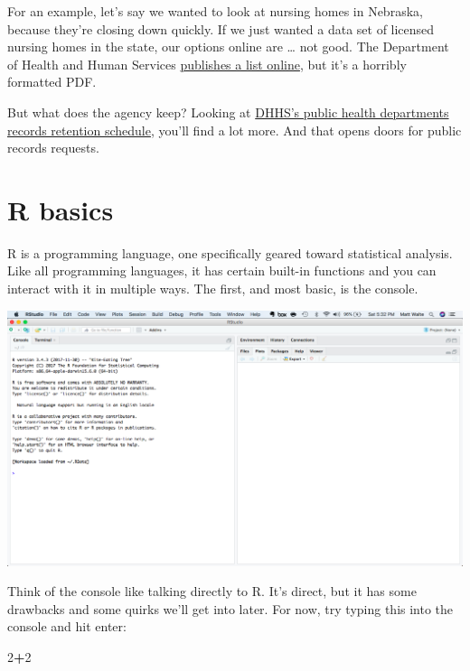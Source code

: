 \documentclass[]{book}
\newenvironment{Shaded}{\begin{snugshade}}{\end{snugshade}}
\newcommand{\DecValTok}[1]{\textcolor[rgb]{0.00,0.00,0.81}{#1}}
\newcommand{\OperatorTok}[1]{\textcolor[rgb]{0.81,0.36,0.00}{\textbf{#1}}}
\begin{document}
For an example, let's say we wanted to look at nursing homes in Nebraska, because they're closing down quickly. If we just wanted a data set of licensed nursing homes in the state, our options online are \ldots{} not good. The Department of Health and Human Services \href{http://dhhs.ne.gov/licensure/Documents/LTCRoster.pdf}{publishes a list online}, but it's a horribly formatted PDF.

But what does the agency keep? Looking at \href{https://sos.nebraska.gov/sites/sos.nebraska.gov/files/doc/records-management/state-government/Health-and-Human-Services/150-6-dhhs-licensure-unit-website-5-12-2014.pdf}{DHHS's public health departments records retention schedule}, you'll find a lot more. And that opens doors for public records requests.

\hypertarget{r-basics}{%
\chapter{R basics}\label{r-basics}}

R is a programming language, one specifically geared toward statistical analysis. Like all programming languages, it has certain built-in functions and you can interact with it in multiple ways. The first, and most basic, is the console.

\includegraphics[width=18.97in]{images/verybasics1}

Think of the console like talking directly to R. It's direct, but it has some drawbacks and some quirks we'll get into later. For now, try typing this into the console and hit enter:

\begin{Shaded}
\begin{Highlighting}[]
\DecValTok{2}\OperatorTok{+}\DecValTok{2}
\end{Highlighting}
\end{Shaded}
\end{document}
